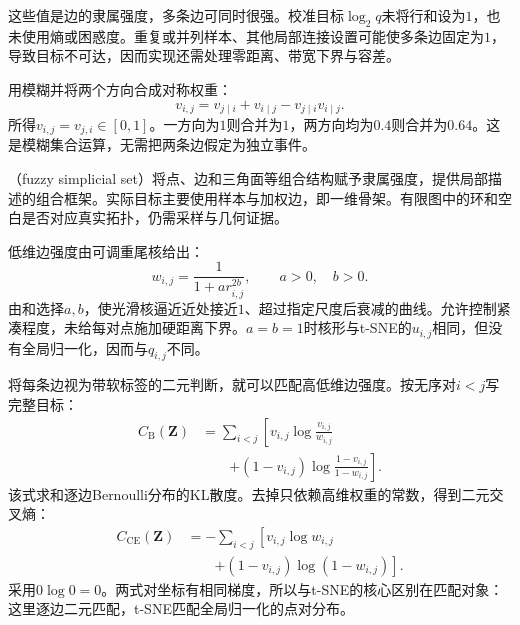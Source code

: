 这些值是边的隶属强度，多条边可同时很强。校准目标$\log_2 q$未将行和设为$1$，也未使用熵或困惑度。重复或并列样本、其他局部连接设置可能使多条边固定为$1$，导致目标不可达，因而实现还需处理零距离、带宽下界与容差。

用模糊并将两个方向合成对称权重：
\begin{equation}
  \label{eq:dim-umap-union}
  v_{i,j}=v_{j\mid i}+v_{i\mid j}-v_{j\mid i}v_{i\mid j}.
\end{equation}
所得$v_{i,j}=v_{j,i}\in[0,1]$。一方向为$1$则合并为$1$，两方向均为$0.4$则合并为$0.64$。这是模糊集合运算，无需把两条边假定为独立事件。

（fuzzy simplicial set）将点、边和三角面等组合结构赋予隶属强度，提供局部描述的组合框架。实际目标主要使用样本与加权边，即一维骨架。有限图中的环和空白是否对应真实拓扑，仍需采样与几何证据。

低维边强度由可调重尾核给出：
\begin{equation}
  \label{eq:dim-umap-kernel}
  w_{i,j}=\frac{1}{1+a r_{i,j}^{2b}},\qquad a>0,\quad b>0.
\end{equation}
由和选择$a,b$，使光滑核逼近近处接近$1$、超过指定尺度后衰减的曲线。允许控制紧凑程度，未给每对点施加硬距离下界。$a=b=1$时核形与t-SNE的$u_{i,j}$相同，但没有全局归一化，因而与$q_{i,j}$不同。

将每条边视为带软标签的二元判断，就可以匹配高低维边强度。按无序对$i<j$写完整目标：
\begin{equation}
  \label{eq:dim-umap-bernoulli}
  \begin{aligned}
    C_{\mathrm{B}}(\bm{Z})
      &=\sum_{i<j}\left[
        v_{i,j}\log\frac{v_{i,j}}{w_{i,j}}\right.\\
      &\qquad\left.+
        (1-v_{i,j})\log\frac{1-v_{i,j}}{1-w_{i,j}}
        \right].
  \end{aligned}
\end{equation}
该式求和逐边Bernoulli分布的KL散度。去掉只依赖高维权重的常数，得到二元交叉熵：
\begin{equation}
  \label{eq:dim-umap-cross-entropy}
  \begin{aligned}
    C_{\mathrm{CE}}(\bm{Z})
      &=-\sum_{i<j}\left[
        v_{i,j}\log w_{i,j}\right.\\
      &\qquad\left.+
        (1-v_{i,j})\log(1-w_{i,j})\right].
  \end{aligned}
\end{equation}
采用$0\log0=0$。两式对坐标有相同梯度，所以与t-SNE的核心区别在匹配对象：这里逐边二元匹配，t-SNE匹配全局归一化的点对分布。

